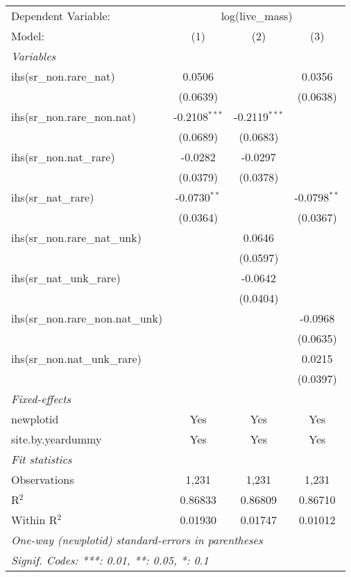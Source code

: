 \begin{tabular}{lccc}
\tabularnewline\midrule\midrule
Dependent Variable:&\multicolumn{3}{c}{log(live\_mass)}\\
Model:&(1) & (2) & (3)\\
\midrule \emph{Variables}&   &   &  \\
ihs(sr\_non.rare\_nat)&0.0506 &    & 0.0356\\
  &(0.0639) &    & (0.0638)\\
ihs(sr\_non.rare\_non.nat)&-0.2108$^{***}$ & -0.2119$^{***}$ &   \\
  &(0.0689) & (0.0683) &   \\
ihs(sr\_non.nat\_rare)&-0.0282 & -0.0297 &   \\
  &(0.0379) & (0.0378) &   \\
ihs(sr\_nat\_rare)&-0.0730$^{**}$ &    & -0.0798$^{**}$\\
  &(0.0364) &    & (0.0367)\\
ihs(sr\_non.rare\_nat\_unk)&   & 0.0646 &   \\
  &   & (0.0597) &   \\
ihs(sr\_nat\_unk\_rare)&   & -0.0642 &   \\
  &   & (0.0404) &   \\
ihs(sr\_non.rare\_non.nat\_unk)&   &    & -0.0968\\
  &   &    & (0.0635)\\
ihs(sr\_non.nat\_unk\_rare)&   &    & 0.0215\\
  &   &    & (0.0397)\\
\midrule \emph{Fixed-effects}&   &   &  \\
newplotid & Yes & Yes & Yes\\
site.by.yeardummy & Yes & Yes & Yes\\
\midrule \emph{Fit statistics}&  & & \\
Observations & 1,231&1,231&1,231\\
R$^2$ & 0.86833&0.86809&0.86710\\
Within R$^2$ & 0.01930&0.01747&0.01012\\
\midrule\midrule\multicolumn{4}{l}{\emph{One-way (newplotid) standard-errors in parentheses}}\\
\multicolumn{4}{l}{\emph{Signif. Codes: ***: 0.01, **: 0.05, *: 0.1}}\\
\end{tabular}



